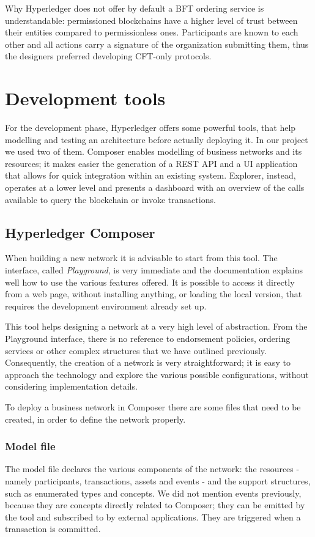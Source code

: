 Why Hyperledger does not offer by default a BFT ordering service is understandable: permissioned blockchains have a higher level of trust between their  entities compared to permissionless ones. Participants are known to each other and all actions carry a signature of the organization submitting them, thus the designers preferred developing CFT-only protocols. 

\section{Development tools}
\label{sec:dev_tools}
For the development phase, Hyperledger offers some powerful tools, that help modelling and testing an architecture before actually deploying it. In our project we used two of them. Composer enables modelling of business networks and its resources; it makes easier the generation of a REST API and a UI application that allows for quick integration within an existing system. Explorer, instead, operates at a lower level and presents a dashboard with an overview of the calls available to query the blockchain or invoke transactions.

\subsection{Hyperledger Composer}
\label{sec:composer}
When building a new network it is advisable to start from this tool. The interface, called \emph{Playground}, is very immediate and the documentation explains well how to use the various features offered. It is possible to access it directly from a web page, without installing anything, or loading the local version, that requires the development environment already set up. 

This tool helps designing a network at a very high level of abstraction. From the Playground interface, there is no reference to endorsement policies, ordering services or other complex structures that we have outlined previously. Consequently, the creation of a network is very straightforward; it is easy to approach the technology and explore the various possible configurations, without considering implementation details. 

To deploy a business network in Composer there are some files that need to be created, in order to define the network properly.

\subsubsection{Model file}
The model file declares the various components of the network: the resources - namely participants, transactions, assets and events - and the support structures, such as enumerated types and concepts. We did not mention events previously, because they are concepts directly related to Composer; they can be emitted by the tool and subscribed to by external applications. They are triggered when a transaction is committed.

